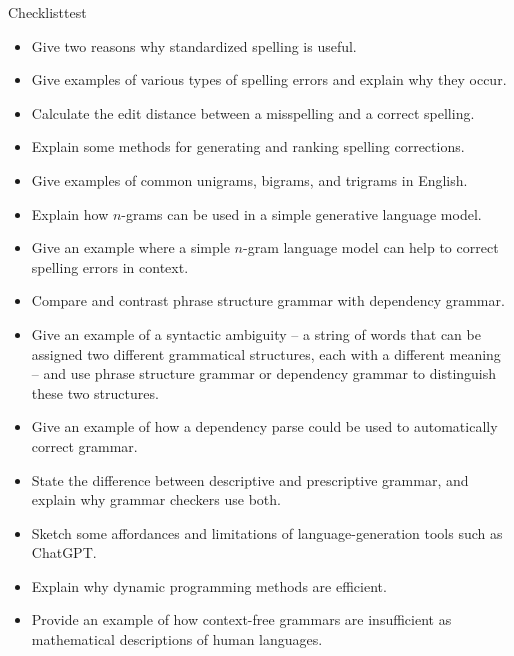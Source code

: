 \begin{tblsfilledsymbol}{Checklist}{test}

\begin{itemize}
\item Give two reasons why standardized spelling is useful.
\item Give examples of various types of spelling errors and explain why they occur.
\item Calculate the edit distance between a misspelling and a correct spelling.
\item Explain some methods for generating and ranking spelling
  corrections.
 \item Give examples of common unigrams, bigrams, and trigrams in English.
 \item Explain how $n$-grams can be used in a simple generative language model.
 \item Give an example where a simple $n$-gram language model can help to correct spelling errors in context.
  \item Compare and contrast phrase structure grammar with dependency grammar.
  \item Give an example of a syntactic ambiguity -- a string of words that can be assigned two different grammatical structures, each with a different meaning -- and use phrase structure grammar or dependency grammar to distinguish these two structures.
  \item Give an example of how a dependency parse could be used to automatically correct grammar.
\item State the difference between descriptive and prescriptive grammar, and explain why grammar checkers use both.
\item Sketch some affordances and limitations of language-generation tools such as ChatGPT.
\item Explain why dynamic programming methods are efficient.
\item Provide an example of how context-free grammars are insufficient as mathematical descriptions of human languages.
\end{itemize}
\end{tblsfilledsymbol}


